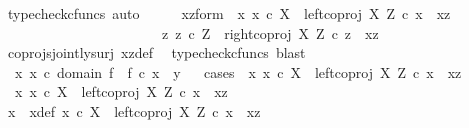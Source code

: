 \begin{isabellebody}
\ {\isacharparenleft}{\kern0pt}typecheck{\isacharunderscore}{\kern0pt}cfuncs{\isacharcomma}{\kern0pt}\ auto{\isacharparenright}{\kern0pt}\isanewline
\ \ \isamarkupfalse%
\ \isamarkupfalse%
\ xz{\isacharunderscore}{\kern0pt}form{\isacharcolon}{\kern0pt}\ {\isachardoublequoteopen}{\isacharparenleft}{\kern0pt}{\isasymexists}\ x{\isachardot}{\kern0pt}\ x\ {\isasymin}\isactrlsub c\ X\ {\isasymand}\ left{\isacharunderscore}{\kern0pt}coproj\ X\ Z\ {\isasymcirc}\isactrlsub c\ x\ {\isacharequal}{\kern0pt}\ xz{\isacharparenright}{\kern0pt}\ {\isasymor}\ \ \isanewline
\ \ \ \ \ \ \ \ \ \ \ \ \ \ \ \ \ \ \ \ \ \ {\isacharparenleft}{\kern0pt}{\isasymexists}\ z{\isachardot}{\kern0pt}\ z\ {\isasymin}\isactrlsub c\ Z\ {\isasymand}\ right{\isacharunderscore}{\kern0pt}coproj\ X\ Z\ {\isasymcirc}\isactrlsub c\ z\ {\isacharequal}{\kern0pt}\ xz{\isacharparenright}{\kern0pt}{\isachardoublequoteclose}\isanewline
\ \ \ \ \isamarkupfalse%
\ coprojs{\isacharunderscore}{\kern0pt}jointly{\isacharunderscore}{\kern0pt}surj\ xz{\isacharunderscore}{\kern0pt}def\ \isamarkupfalse%
\ {\isacharparenleft}{\kern0pt}typecheck{\isacharunderscore}{\kern0pt}cfuncs{\isacharcomma}{\kern0pt}\ blast{\isacharparenright}{\kern0pt}\isanewline
\ \ \isamarkupfalse%
\ {\isachardoublequoteopen}{\isasymexists}\ x{\isachardot}{\kern0pt}\ x\ {\isasymin}\isactrlsub c\ domain\ f\ {\isasymand}\ f\ {\isasymcirc}\isactrlsub c\ x\ {\isacharequal}{\kern0pt}\ y{\isachardoublequoteclose}\isanewline
\ \ \isamarkupfalse%
{\isacharparenleft}{\kern0pt}cases\ {\isachardoublequoteopen}{\isasymexists}\ x{\isachardot}{\kern0pt}\ x\ {\isasymin}\isactrlsub c\ X\ {\isasymand}\ left{\isacharunderscore}{\kern0pt}coproj\ X\ Z\ {\isasymcirc}\isactrlsub c\ x\ {\isacharequal}{\kern0pt}\ xz{\isachardoublequoteclose}{\isacharparenright}{\kern0pt}\isanewline
\ \ \ \ \isamarkupfalse%
\ {\isachardoublequoteopen}{\isasymexists}\ x{\isachardot}{\kern0pt}\ x\ {\isasymin}\isactrlsub c\ X\ {\isasymand}\ left{\isacharunderscore}{\kern0pt}coproj\ X\ Z\ {\isasymcirc}\isactrlsub c\ x\ {\isacharequal}{\kern0pt}\ xz{\isachardoublequoteclose}\isanewline
\ \ \ \ \isamarkupfalse%
\ \isamarkupfalse%
\ x\ \ x{\isacharunderscore}{\kern0pt}def{\isacharcolon}{\kern0pt}\ {\isachardoublequoteopen}x\ {\isasymin}\isactrlsub c\ X\ {\isasymand}\ left{\isacharunderscore}{\kern0pt}coproj\ X\ Z\ {\isasymcirc}\isactrlsub c\ x\ {\isacharequal}{\kern0pt}\ xz{\isachardoublequoteclose}\isanewline
\ \ \ \ \ \ \isamarkupfalse%

\end{isabellebody}
